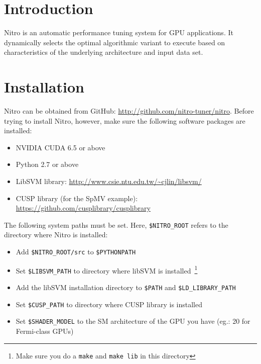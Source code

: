 \documentclass[12pt]{article}
\begin{document}
\maketitle

\section{Introduction}
Nitro is an automatic performance tuning system for GPU applications.
It dynamically selects the optimal algorithmic variant to execute based
on characteristics of the underlying architecture and input data set.  

\section{Installation}
Nitro can be obtained from GitHub: \url{http://github.com/nitro-tuner/nitro}.
Before trying to install Nitro, however, make sure the following software packages are installed:

\begin{itemize}
  \item NVIDIA CUDA 6.5 or above
  \item Python 2.7 or above
  \item LibSVM library: \url{http://www.csie.ntu.edu.tw/~cjlin/libsvm/}
  \item CUSP library (for the SpMV example): \url{https://github.com/cusplibrary/cusplibrary}
\end{itemize}

The following system paths must be set. Here, \texttt{\$NITRO\_ROOT} refers
to the directory where Nitro is installed:

\begin{itemize}
  \item Add \texttt{\$NITRO\_ROOT/src} to \texttt{\$PYTHONPATH}
  \item Set \texttt{\$LIBSVM\_PATH} to directory where libSVM is installed~\footnote{Make sure you do a \texttt{make} and \texttt{make lib} in this directory}
  \item Add the libSVM installation directory to \texttt{\$PATH} and \texttt{\$LD\_LIBRARY\_PATH}
  \item Set \texttt{\$CUSP\_PATH} to directory where CUSP library is installed
  \item Set \texttt{\$SHADER\_MODEL} to the SM architecture of the GPU you have (eg.: 20 for Fermi-class GPUs)
\end{itemize}
\end{document}
